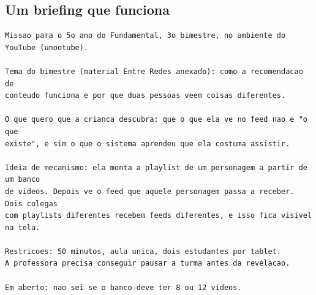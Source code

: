 \documentclass[11pt,a4paper]{article}
\begin{document}
\begin{center}
\end{center}

\subsection{Um briefing que funciona}

\begin{lstlisting}
Missao para o 5o ano do Fundamental, 3o bimestre, no ambiente do YouTube (unootube).

Tema do bimestre (material Entre Redes anexado): como a recomendacao de
conteudo funciona e por que duas pessoas veem coisas diferentes.

O que quero que a crianca descubra: que o que ela ve no feed nao e "o que
existe", e sim o que o sistema aprendeu que ela costuma assistir.

Ideia de mecanismo: ela monta a playlist de um personagem a partir de um banco
de videos. Depois ve o feed que aquele personagem passa a receber. Dois colegas
com playlists diferentes recebem feeds diferentes, e isso fica visivel na tela.

Restricoes: 50 minutos, aula unica, dois estudantes por tablet.
A professora precisa conseguir pausar a turma antes da revelacao.

Em aberto: nao sei se o banco deve ter 8 ou 12 videos.
\end{lstlisting}
\end{document}
